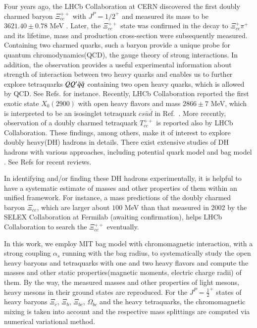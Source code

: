\documentclass[prd,twocolumn,floatfix,nofootinbib]{revtex4}
\begin{document}
Four years ago, the LHCb Collaboration at CERN discovered the first doubly
charmed baryon $\Xi _{cc}^{++}$ with $J^{P}={1/2}^{+}$ and measured its mass
to be $3621.40\pm 0.78$ MeV \cite{Aaij:2017ueg}. Later, the $\Xi _{cc}^{++}$
state was confirmed in the decay to $\Xi _{cc}^{+}\pi ^{+}$\cite{LhcXi:prl18}
and its lifetime, mass and production cross-section were subsequently
measured\cite{LhcXiLf:prl18,LhcXcc:cp20}. Containing two charmed quarks,
such a baryon provide a unique probe for quantum chromodynamics(QCD), the
gauge theory of strong interactions. In addition, the observation provides a
useful experimental information about strength of interaction between two
heavy quarks and enables us to further explore tetraquarks $QQ^{\prime }\bar{%
q}\bar{q}$ containing two open heavy quarks, which is allowed by QCD. See
Refs. \cite{Karliner:2017qjm,Eichten:2017ffp,Luo:2017eub} for instance.
Recently, LHCb Collaboration reported the first exotic state $X_{0}(2900)$
with open heavy flavors and mass $2866\pm 7$ MeV\cite{LHCb:2020kd}, which is
interpreted to be an isosinglet tetraquark $cs\bar{u}\bar{d}$ in Ref.~\cite%
{Karliner:2020vsi}. More recently, observation of a doubly charmed
tetraquark $T_{cc}^{++}$ is reported also by LHCb Collaboration\cite%
{TccPoly:2021}. These findings, among others, make it of interest to explore
doubly heavy(DH) hadrons in details. There exist extensive studies of DH
hadrons with various approaches, including potential quark model and bag
model \cite%
{Fleck:1989mb,Ebert:2004ck,Bernotas:2012nz,He:2004px,KR:2014gca,Liu:2018euh}%
. See Refs \cite{Ali:2017jda,Liu:2019zoy} for recent reviews.

In identifying and/or finding these DH hadrons experimentally, it is helpful
to have a systematic estimate of masses and other properties of them within
an unified framework. For instance, a mass predictions \cite%
{Ebert:2004ck,KR:2014gca} of the doubly charmed baryon $\Xi _{cc}$, which
are larger about $100$ MeV than that measured in 2002 by the SELEX
Collaboration at Fermilab \cite{Moinester:2002uw}(awaiting confirmation),
helps LHCb Collaboration to search the $\Xi _{cc}^{++}$\cite{Aaij:2017ueg}
eventually.

In this work, we employ MIT bag model with chromomagnetic interaction, with
a strong coupling $\alpha _{s}$ running with the bag radius, to
systematically study the open heavy baryons and tetraquarks with one and two
heavy flavors and compute the masses and other static properties(magnetic
moments, electric charge radii) of them. By the way, the measured masses and
other properties of light mesons, heavy mesons in their ground states are
reproduced. For the $J^{P}={\frac{1}{2}}^{+}$ states of heavy baryons $\Xi
_{c}$, $\Xi _{b}$, $\Xi _{bc}$, $\Omega _{bc}$ and the heavy tetraquarks,
the chromomagnetic mixing is taken into account and the respective mass
splittings are computed via numerical variational method.
\end{document}
